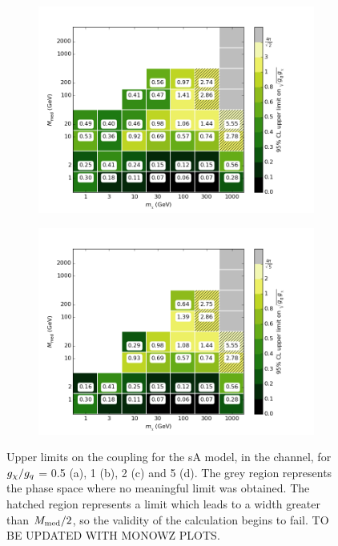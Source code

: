 \begin{figure}[h]
\begin{subfigure}[t]{0.495\textwidth}
      \includegraphics[width=1.\textwidth]{figures/grid_allpoints_SAD_rat2.png}
      \caption{}
    \end{subfigure}
    \begin{subfigure}[t]{0.495\textwidth}
      \centering
      \includegraphics[width=1.\textwidth]{figures/grid_allpoints_SAD_rat5.png}
      \caption{}
    \end{subfigure}
    \caption{Upper limits on the coupling for the sA model, in the \monoWZ channel, for $g_{\chi} / g_q$ = 0.5 (a), 1 (b), 2 (c) and 5 (d). The grey region represents the phase space where no meaningful limit was obtained. The hatched region represents a limit which leads to a width greater than $M_{\mathrm{med}} / 2$, so the validity of the calculation begins to fail. TO BE UPDATED WITH MONOWZ PLOTS.}
    \label{fig:MonoWZ_SAD_couplinglimit}
\end{figure}

